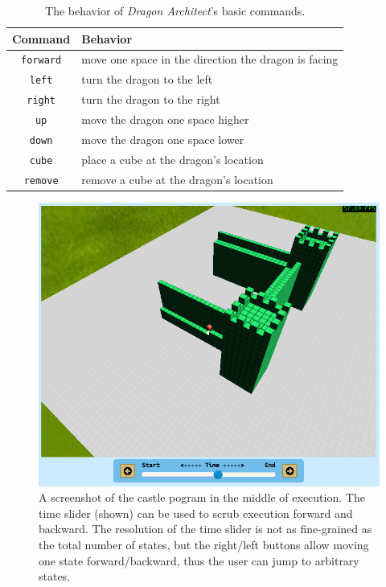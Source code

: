 \documentclass{sig-alternate}
\newcommand{\da}{\emph{Dragon Architect}}
\begin{document}
\begin{table}[ht!]
  \centering
  \begin{tabular}{|c|p{6cm}|}
    \hline
    Command & Behavior \\\hline
    \texttt{forward} & move one space in the direction the dragon is facing \\\hline
    \texttt{left} & turn the dragon to the left \\\hline
    \texttt{right} & turn the dragon to the right \\\hline
    \texttt{up} & move the dragon one space higher \\\hline
    \texttt{down} & move the dragon one space lower \\\hline
    \texttt{cube} & place a cube at the dragon's location \\\hline
    \texttt{remove} & remove a cube at the dragon's location \\\hline
  \end{tabular}
  \caption{The behavior of \da{}'s basic commands.}
  \label{tab:commands}
\end{table}

\begin{figure}[ht!]
  \centering
  \includegraphics[width=0.9\columnwidth]{images/castle-time-slider}
  \caption{A screenshot of the castle pogram in the middle of execution. The time slider (shown) can be used to scrub execution forward and backward. The resolution of the time slider is not as fine-grained as the total number of states, but the right/left buttons allow moving one state forward/backward, thus the user can jump to arbitrary states.}
  \label{fig:time-slider}
\end{figure}
\end{document}
